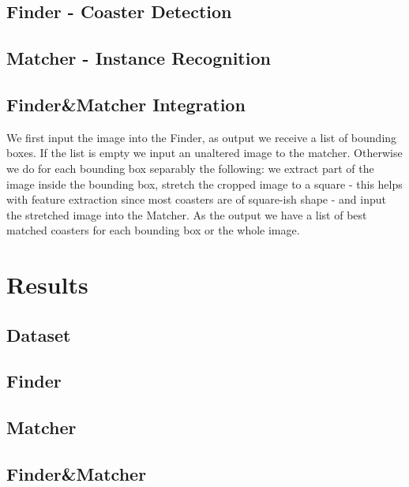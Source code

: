 \documentclass{article}
\begin{document}
\subsection{Finder - Coaster Detection}


\subsection{Matcher - Instance Recognition}



\subsection{Finder\&Matcher Integration}

We first input the image into the Finder, as output we receive a list of bounding boxes.
If the list is empty we input an unaltered image to the matcher.
Otherwise we do for each bounding box separably the following: 
we extract part of the image inside the bounding box, 
stretch the cropped image to a square - this helps with feature extraction since most coasters are of square-ish shape - 
and input the stretched image into the Matcher.
As the output we have a list of best matched coasters for each bounding box or the whole image. 



\section{Results}
\subsection{Dataset}

\subsection{Finder}

\subsection{Matcher}

\subsection{Finder\&Matcher}
\end{document}
